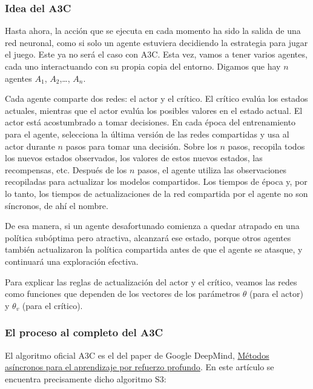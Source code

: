 \documentclass[
]{book}
\begin{document}
\hypertarget{idea-del-a3c}{%
\subsubsection{Idea del A3C}\label{idea-del-a3c}}

Hasta ahora, la acción que se ejecuta en cada momento ha sido la salida de una red neuronal, como si solo un agente estuviera decidiendo la estrategia para jugar el juego. Este ya no será el caso con A3C. Esta vez, vamos a tener varios agentes, cada uno interactuando con su propia copia del entorno. Digamos que hay \(n\) agentes \(A_1\), \(A_2\),\ldots, \(A_n\).

Cada agente comparte dos redes: el actor y el crítico. El crítico evalúa los estados actuales, mientras que el actor evalúa los posibles valores en el estado actual. El actor está acostumbrado a tomar decisiones. En cada época del entrenamiento para el agente, selecciona la última versión de las redes compartidas y usa al actor durante \(n\) pasos para tomar una decisión. Sobre los \(n\) pasos, recopila todos los nuevos estados observados, los valores de estos nuevos estados, las recompensas, etc. Después de los \(n\) pasos, el agente utiliza las observaciones recopiladas para actualizar los modelos compartidos. Los tiempos de época y, por lo tanto, los tiempos de actualizaciones de la red compartida por el agente no son síncronos, de ahí el nombre.

De esa manera, si un agente desafortunado comienza a quedar atrapado en una política subóptima pero atractiva, alcanzará ese estado, porque otros agentes también actualizaron la política compartida antes de que el agente se atasque, y continuará una exploración efectiva.

Para explicar las reglas de actualización del actor y el crítico, veamos las redes como funciones que dependen de los vectores de los parámetros \(\theta\) (para el actor) y \(\theta_v\) (para el crítico).

\hypertarget{el-proceso-al-completo-del-a3c}{%
\subsubsection{El proceso al completo del A3C}\label{el-proceso-al-completo-del-a3c}}

El algoritmo oficial A3C es el del paper de Google DeepMind, \href{https://arxiv.org/pdf/1602.01783.pdf}{Métodos asíncronos para el aprendizaje por refuerzo profundo}. En este artículo se encuentra precisamente dicho algoritmo S3:
\end{document}
